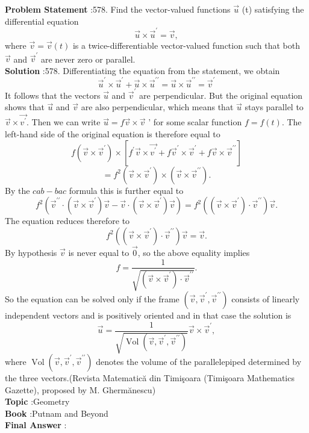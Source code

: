 \documentclass[10pt]{article}
\begin{document}
\textbf{Problem Statement} :578. Find the vector-valued functions $\vec{u}$ (t) satisfying the differential equation$$ \vec{u} \times \vec{u}^{\prime}=\vec{v}, $$where $\vec{v}=\vec{v}(t)$ is a twice-differentiable vector-valued function such that both $\vec{v}$ and $\vec{v}^{\prime}$ are never zero or parallel. \\
\textbf{Solution} :578. Differentiating the equation from the statement, we obtain$$ \vec{u}^{\prime} \times \vec{u}^{\prime}+\vec{u} \times \vec{u}^{\prime \prime}=\vec{u} \times \vec{u}^{\prime \prime}=\vec{v}^{\prime} $$It follows that the vectors $\vec{u}$ and $\vec{v}^{\prime}$ are perpendicular. But the original equation shows that $\vec{u}$ and $\vec{v}$ are also perpendicular, which means that $\vec{u}$ stays parallel to $\vec{v} \times \overrightarrow{v^{\prime}}$. Then we can write $\vec{u}=f \vec{v} \times \vec{v}$ ' for some scalar function $f=f(t)$. The left-hand side of the original equation is therefore equal to$$ f\left(\vec{v} \times \vec{v}^{\prime}\right) \times\left[f^{\prime} \vec{v} \times \overrightarrow{v^{\prime}}+f \vec{v}^{\prime} \times \vec{v}^{\prime}+f \vec{v} \times \vec{v}^{\prime \prime}\right] $$$$ =f^{2}\left(\vec{v} \times \vec{v}^{\prime}\right) \times\left(\vec{v} \times \vec{v}^{\prime \prime}\right) . $$By the $c a b-b a c$ formula this is further equal to$$ f^{2}\left(\vec{v}^{\prime \prime} \cdot\left(\vec{v} \times \vec{v}^{\prime}\right) \vec{v}-\vec{v} \cdot\left(\vec{v} \times \vec{v}^{\prime}\right) \vec{v}\right)=f^{2}\left(\left(\vec{v} \times \vec{v}^{\prime}\right) \cdot \vec{v}^{\prime \prime}\right) \vec{v} . $$The equation reduces therefore to$$ f^{2}\left(\left(\vec{v} \times \vec{v}^{\prime}\right) \cdot \vec{v}^{\prime \prime}\right) \vec{v}=\vec{v} . $$By hypothesis $\vec{v}$ is never equal to $\overrightarrow{0}$, so the above equality implies$$ f=\frac{1}{\sqrt{\left(\vec{v} \times \vec{v}^{\prime}\right) \cdot \vec{v}^{\prime \prime}}} . $$So the equation can be solved only if the frame $\left(\vec{v}, \vec{v}^{\prime}, \vec{v}^{\prime \prime}\right)$ consists of linearly independent vectors and is positively oriented and in that case the solution is$$ \vec{u}=\frac{1}{\sqrt{\operatorname{Vol}\left(\vec{v}, \vec{v}^{\prime}, \vec{v}^{\prime \prime}\right)}} \vec{v} \times \vec{v}^{\prime}, $$where $\operatorname{Vol}\left(\vec{v}, \vec{v}^{\prime}, \vec{v}^{\prime \prime}\right)$ denotes the volume of the parallelepiped determined by the three vectors.(Revista Matematică din Timişoara (Timişoara Mathematics Gazette), proposed by M. Ghermănescu)\\
\textbf{Topic} :Geometry\\
\textbf{Book} :Putnam and Beyond\\
\textbf{Final Answer} :\\
\end{document}
